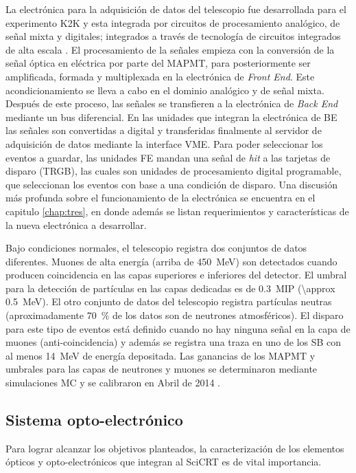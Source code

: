La electrónica para la adquisición de datos del telescopio fue desarrollada para el experimento K2K y esta integrada por circuitos de procesamiento analógico, de señal mixta y digitales; integrados a través de tecnología de circuitos integrados de alta escala \cite{myoshi04}. El procesamiento de la señales empieza con la conversión de la señal óptica en eléctrica por parte del MAPMT, para posteriormente ser amplificada, formada y multiplexada en la electrónica de \emph{Front End}. Este acondicionamiento se lleva a cabo en el dominio analógico y de señal mixta. Después de este proceso, las señales se transfieren a la electrónica de \emph{Back End} mediante un bus diferencial. En las unidades que integran la electrónica de BE las señales son convertidas a digital y transferidas finalmente al servidor de adquisición de datos mediante la interface VME. Para poder seleccionar los eventos a guardar, las unidades FE mandan una señal de \emph{hit} a las tarjetas de disparo (TRGB), las cuales son unidades de procesamiento digital programable, que seleccionan los eventos con base a una condición de disparo. Una discusión más profunda sobre el funcionamiento de la electrónica se encuentra en el capitulo \ref{chap:tres}, en donde además se listan requerimientos y características de la nueva electrónica a desarrollar.

Bajo condiciones normales, el telescopio registra dos conjuntos de datos diferentes. Muones de alta energía (arriba de \SI{450}{\mega\electronvolt}) son detectados cuando producen coincidencia en las capas superiores e inferiores del detector. El umbral para la detección de partículas en las capas dedicadas es de \SI{0.3}{MIP} (\SI{\approx 0.5}{\mega\electronvolt}). El otro conjunto de datos del telescopio registra partículas neutras (aproximadamente \SI{70}{\percent} de los datos son de neutrones atmosféricos). El disparo para este tipo de eventos está definido cuando no hay ninguna señal en la capa de muones (anti-coincidencia) y además se registra una traza en uno de los SB con al menos \SI{14}{\mega\electronvolt} de energía depositada. Las ganancias de los MAPMT y umbrales para las capas de neutrones y muones se determinaron mediante simulaciones MC y se calibraron en Abril de \num{2014} \cite{ysasai14}.

\subsection{Sistema opto-electrónico}

Para lograr alcanzar los objetivos planteados, la caracterización de los elementos ópticos y opto-electrónicos que integran al SciCRT es de vital importancia.


